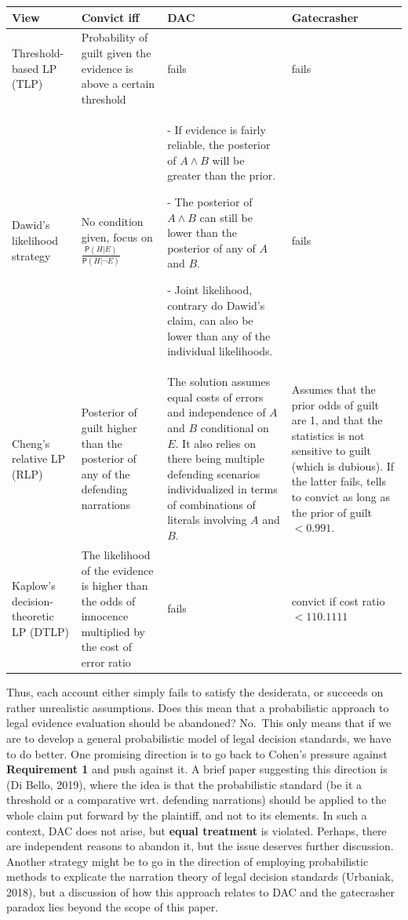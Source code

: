 \documentclass[10pt,dvipsnames,enabledeprecatedfontcommands]{scrartcl}
\newcommand{\n}{\neg}
\newcommand{\et}{\wedge}
\newcommand{\pr}[1]{\mathsf{P}(#1)}
\begin{document}
\begin{center}
\footnotesize 
 \begin{tabular}{@{}p{3cm}p{2.5cm}p{4cm}p{3cm}@{}}
\toprule
\textbf{View} & \textbf{Convict iff} & \textbf{DAC} & \textbf{Gatecrasher} \\ \midrule
Threshold-based LP (TLP) & Probability of guilt given the evidence is above a certain threshold & fails & fails \\
Dawid's likelihood strategy & No condition given, focus on $\frac{\pr{H\vert E}}{\pr{H\vert \n E}}$ & - If evidence is fairly reliable, the posterior of $A\et B$ will be greater than the prior.

- The posterior of $A\et B$ can still be lower than the posterior of any of $A$ and $B$.

- Joint likelihood, contrary do Dawid's claim, can also be lower than any of the individual likelihoods. & fails  \\
Cheng's relative LP (RLP)
& Posterior of guilt higher than the posterior of any of the defending narrations & The solution assumes equal costs of errors and independence of $A$ and $B$ conditional on $E$. It also relies on there being multiple defending scenarios individualized in terms of  combinations of literals involving $A$ and $B$. & Assumes that the prior odds of guilt are 1, and that the statistics is not sensitive to guilt (which is dubious). If the latter fails, tells to convict as long as the prior of guilt $<0.991$. \\
Kaplow's decision-theoretic LP (DTLP) &
The likelihood of the evidence is higher than the odds of innocence multiplied by the cost of error ratio & fails & convict if cost ratio $<110.1111$
\end{tabular} 
 \end{center}

Thus, each account either simply fails to satisfy the desiderata, or
succeeds on rather unrealistic assumptions. Does this mean that a
probabilistic approach to legal evidence evaluation should be abandoned?
No.~This only means that if we are to develop a general probabilistic
model of legal decision standards, we have to do better. One promising
direction is to go back to Cohen's pressure against
\textbf{Requirement 1} and push against it. A brief paper suggesting
this direction is (Di Bello, 2019), where the idea is that the
probabilistic standard (be it a threshold or a comparative wrt.
defending narrations) should be applied to the whole claim put forward
by the plaintiff, and not to its elements. In such a context, DAC does
not arise, but \textbf{equal treatment} is violated. Perhaps, there are
independent reasons to abandon it, but the issue deserves further
discussion. Another strategy might be to go in the direction of
employing probabilistic methods to explicate the narration theory of
legal decision standards (Urbaniak, 2018), but a discussion of how this
approach relates to DAC and the gatecrasher paradox lies beyond the
scope of this paper.
\end{document}
